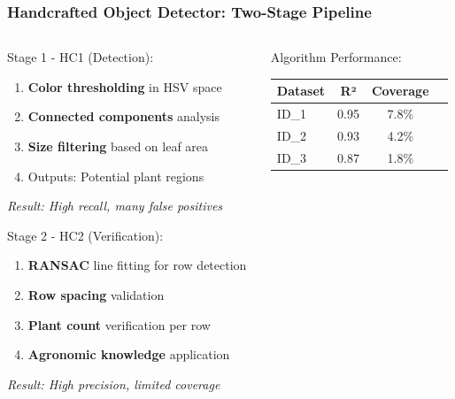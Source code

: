 \documentclass[aspectratio=43]{beamer}
\begin{document}
\begin{frame}
    \frametitle{Handcrafted Object Detector: Two-Stage Pipeline}
    
    \begin{columns}
        \begin{column}{0.5\textwidth}
            \begin{block}{Stage 1 - HC1 (Detection):}
                \small
                \begin{enumerate}
                    \item \textbf{Color thresholding} in HSV space
                    \item \textbf{Connected components} analysis
                    \item \textbf{Size filtering} based on leaf area
                    \item Outputs: Potential plant regions
                \end{enumerate}
                
                \textit{Result: High recall, many false positives}
            \end{block}
            
            \begin{block}{Stage 2 - HC2 (Verification):}
                \small
                \begin{enumerate}
                    \item \textbf{RANSAC} line fitting for row detection
                    \item \textbf{Row spacing} validation
                    \item \textbf{Plant count} verification per row
                    \item \textbf{Agronomic knowledge} application
                \end{enumerate}
                
                \textit{Result: High precision, limited coverage}
            \end{block}
        \end{column}
        
        \begin{column}{0.5\textwidth}
            \begin{exampleblock}{Algorithm Performance:}
                \small
                \begin{table}[h]
                    \scriptsize
                    \begin{tabular}{lccc}
                        \textbf{Dataset} & \textbf{R²} & \textbf{Coverage} \\
                        \hline
                        ID\_1 & 0.95 & 7.8\% \\
                        ID\_2 & 0.93 & 4.2\% \\
                        ID\_3 & 0.87 & 1.8\% \\
                    \end{tabular}
                \end{table}
            \end{exampleblock}
            

\end{column}
\end{columns}
\end{frame}
\end{document}
